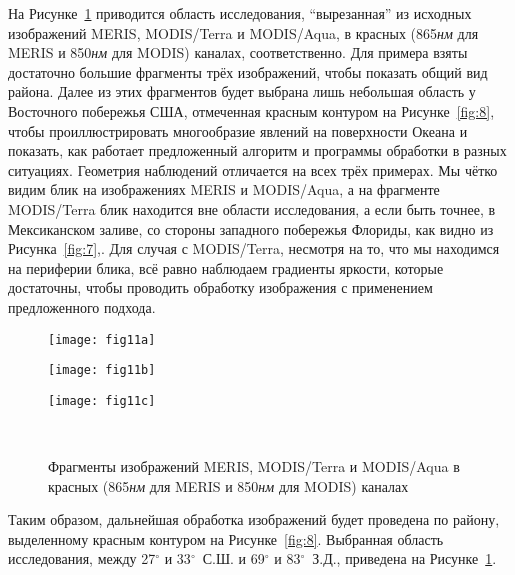 На Рисунке~\ref{fig:11} приводится область исследования, ``вырезанная'' из исходных изображений MERIS, MODIS/Terra и MODIS/Aqua, в красных (865\textit{нм} для MERIS и 850\textit{нм} для MODIS) каналах, соответственно. Для примера взяты достаточно большие фрагменты трёх изображений, чтобы показать общий вид района. Далее из этих фрагментов будет выбрана лишь небольшая область у Восточного побережья США, отмеченная красным контуром на Рисунке~\ref{fig:8}, чтобы проиллюстрировать многообразие явлений на поверхности Океана и показать, как работает предложенный алгоритм и программы обработки в разных ситуациях. Геометрия наблюдений отличается на всех трёх примерах. Мы чётко видим блик на изображениях MERIS и MODIS/Aqua, а на фрагменте MODIS/Terra блик находится вне области исследования, а если быть точнее, в Мексиканском заливе, со стороны западного побережья Флориды, как видно из Рисунка~\ref{fig:7},. Для случая с MODIS/Terra, несмотря на то, что мы находимся на периферии блика, всё равно наблюдаем градиенты яркости, которые достаточны, чтобы проводить обработку изображения с применением предложенного подхода.



\begin{figure}[H]
    	\centering
	\begin{minipage}{.31\textwidth}
	    \subcaptionbox{\label{fig:11a}}
		{\texttt{[image: fig11a]}}
	\end{minipage}
	\hfill
	\begin{minipage}{.31\textwidth}
	    \subcaptionbox{\label{fig:11b}}
		{\texttt{[image: fig11b]}}
	\end{minipage}
	\hfill
	\begin{minipage}{.31\textwidth}
	    \subcaptionbox{\label{fig:11c}}
		{\texttt{[image: fig11c]}}
	\end{minipage}
	\\
    \caption{Фрагменты изображений MERIS, MODIS/Terra и MODIS/Aqua в красных (865\textit{нм} для MERIS и 850\textit{нм} для MODIS) каналах}
    \label{fig:11}
\end{figure}

Таким образом, дальнейшая обработка изображений будет проведена по району, выделенному красным контуром на Рисунке~\ref{fig:8}. Выбранная область исследования, между 27${}^\circ$ и 33${}^\circ$~С.Ш. и 69${}^\circ$ и 83${}^\circ$~З.Д., приведена на Рисунке~\ref{fig:11}.


